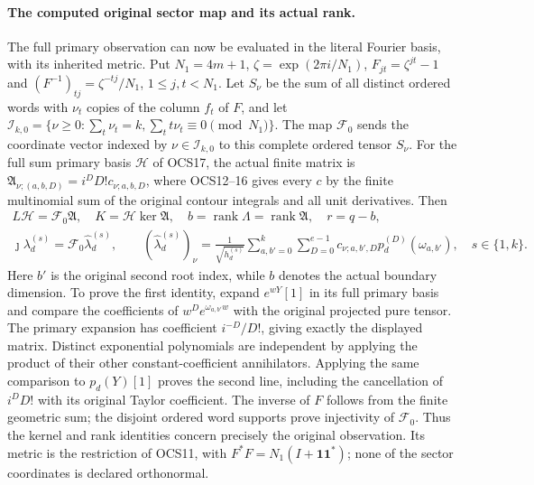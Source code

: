 \documentclass[11pt,a4paper]{article}
\begin{document}
\paragraph{The computed original sector map and its actual rank.}
The full primary observation can now be evaluated in the literal
Fourier basis, with its inherited metric. Put $N_1=4m+1$,
$\zeta=\exp(2\pi i/N_1)$, $F_{jt}=\zeta^{jt}-1$ and
$(F^{-1})_{tj}=\zeta^{-tj}/N_1$, $1\le j,t<N_1$.
Let $S_\nu$ be the sum of all distinct ordered words with
$\nu_t$ copies of the column $f_t$ of $F$, and let
$\mathcal I_{k,0}=\{\nu\ge0:\sum_t\nu_t=k,
\sum_t t\nu_t\equiv0\pmod {N_1}\}$.
The map $\mathcal F_0$ sends the coordinate vector indexed by
$\nu\in\mathcal I_{k,0}$ to this complete ordered tensor $S_\nu$.
For the full sum primary basis $\mathcal H$ of OCS17, the actual
finite matrix is $\mathfrak A_{\nu;(a,b,D)}=i^DD!c_{\nu;a,b,D}$,
where OCS12--16 gives every $c$ by the finite multinomial sum of
the original contour integrals and all unit derivatives. Then
\[
\begin{gathered}
 L\mathcal H=\mathcal F_0\mathfrak A,\quad
 K=\mathcal H\ker\mathfrak A,\quad
 b=\operatorname{rank}\Lambda=\operatorname{rank}\mathfrak A,\quad r=q-b,\\
 \jmath\lambda_d^{(s)}=\mathcal F_0\widehat\lambda_d^{(s)},\qquad
 (\widehat\lambda_d^{(s)})_\nu
 =\frac1{\sqrt{h_d^{(s)}}}\sum_{a,b'=0}^k\sum_{D=0}^{e-1}
 c_{\nu;a,b',D}p_d^{(D)}(\omega_{a,b'}),\quad s\in\{1,k\}.
\end{gathered}\tag{MRI1c}
\]
Here $b'$ is the original second root index, while $b$ denotes
the actual boundary dimension. To prove the first identity,
expand $e^{wY}[1]$ in its full primary basis and compare the
coefficients of $w^De^{\omega_{a,b'}w}$ with the original
projected pure tensor. The primary expansion has coefficient
$i^{-D}/D!$, giving exactly the displayed matrix. Distinct
exponential polynomials are independent by applying the product
of their other constant-coefficient annihilators. Applying the
same comparison to $p_d(Y)[1]$ proves the second line, including
the cancellation of $i^DD!$ with its original Taylor coefficient.
The inverse of $F$ follows from the finite geometric sum;
the disjoint ordered word supports prove injectivity of
$\mathcal F_0$. Thus the kernel and rank identities concern
precisely the original observation. Its metric is the restriction
of OCS11, with $F^*F=N_1(I+\mathbf1\mathbf1^*)$; none of the
sector coordinates is declared orthonormal.
\end{document}
